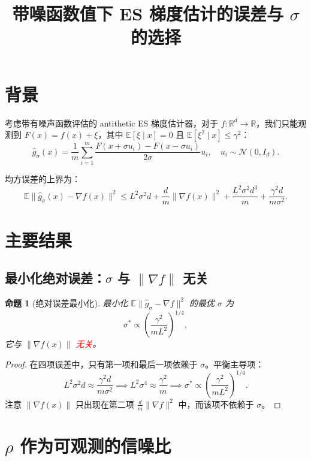 \documentclass[UTF8]{ctexart}
\title{带噪函数值下 ES 梯度估计的误差与 $\sigma$ 的选择}
\author{}
\date{}
\newtheorem{proposition}{命题}
\begin{document}
\maketitle

\section{背景}

考虑带有噪声函数评估的 antithetic ES 梯度估计器，对于 $f:\mathbb{R}^d\to\mathbb{R}$，我们只能观测到 $F(x) = f(x) + \xi$，其中 $\mathbb{E}[\xi\mid x]=0$ 且 $\mathbb{E}[\xi^2\mid x]\leq\gamma^2$：
\[
\widehat{g}_\sigma(x) = \frac{1}{m}\sum_{i=1}^m \frac{F(x+\sigma u_i) - F(x-\sigma u_i)}{2\sigma}u_i,
\quad u_i\sim\mathcal{N}(0,I_d).
\]

均方误差的上界为：
\[
\mathbb{E}\|\widehat{g}_\sigma(x) - \nabla f(x)\|^2
\leq
L^2\sigma^2 d + \frac{d}{m}\|\nabla f(x)\|^2 + \frac{L^2\sigma^2 d^3}{m} + \frac{\gamma^2 d}{m\sigma^2}.
\]

\section{主要结果}

\subsection{最小化绝对误差：$\sigma$ 与 $\|\nabla f\|$ 无关}

\begin{proposition}[绝对误差最小化]
\label{prop:abs}
最小化 $\mathbb{E}\|\widehat{g}_\sigma - \nabla f\|^2$ 的最优 $\sigma$ 为
\[
\sigma^* \propto \left(\frac{\gamma^2}{mL^2}\right)^{1/4},
\]
它与 $\|\nabla f(x)\|$ \textcolor{red}{无关}。
\end{proposition}

\begin{proof}
在四项误差中，只有第一项和最后一项依赖于 $\sigma$。平衡主导项：
\[
L^2\sigma^2 d \approx \frac{\gamma^2 d}{m\sigma^2}
\implies
L^2\sigma^4 \approx \frac{\gamma^2}{m}
\implies
\sigma^* \propto \left(\frac{\gamma^2}{mL^2}\right)^{1/4}.
\]
注意 $\|\nabla f(x)\|$ 只出现在第二项 $\frac{d}{m}\|\nabla f\|^2$ 中，而该项不依赖于 $\sigma$。
\end{proof}

\section{$\rho$ 作为可观测的信噪比}
\end{document}
